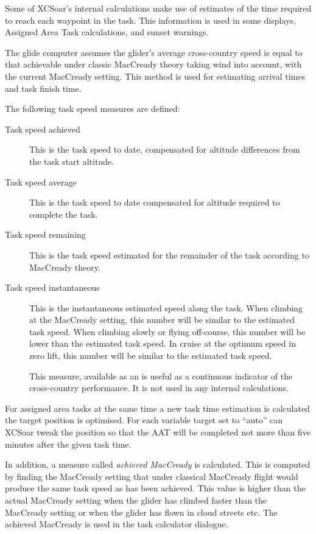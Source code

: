 Some of XCSoar's internal calculations make use of estimates of the
time required to reach each waypoint in the task.  This information is
used in some {\InfoBox} displays, Assigned Area Task calculations, and
sunset warnings.

The glide computer assumes the glider's average cross-country speed is
equal to that achievable under classic MacCready theory taking wind
into account, with the current MacCready setting.  This method is used
for estimating arrival times and task finish time.

The following task speed measures are defined:
\begin{description}
\item[Task speed achieved]  This is the task speed to date, compensated
for altitude differences from the task start altitude.
\item[Task speed average]  This is the task speed to date compensated
for altitude required to complete the task.
\item[Task speed remaining]  This is the task speed estimated for the
  remainder of the task according to MacCready theory.
\item[Task speed instantaneous]  This is the instantaneous estimated speed 
along the task.  When climbing at the MacCready setting, this number
will be similar to the estimated task speed.  When climbing slowly or
flying off-course, this number will be lower than the estimated task
speed.  In cruise at the optimum speed in zero lift, this number will
be similar to the estimated task speed.

This measure, available as an {\InfoBox} is useful as a continuous
indicator of the cross-country performance.  It is not used in any
internal calculations.
\end{description}

For assigned area tasks at the same time a new task time estimation is
calculated the target position is optimised. \tip For each variable target set
to ``auto'' can XCSoar tweak the position so that the AAT will be completed not
more than five minutes after the given task time.

In addition, a measure called {\em achieved MacCready} is calculated.
This is computed by finding the MacCready setting that under classical
MacCready flight would produce the same task speed as has been
achieved.  This value is higher than the actual MacCready setting when
the glider has climbed faster than the MacCready setting or when the
glider has flown in cloud streets etc.  The achieved MacCready is used
in the task calculator dialogue.

